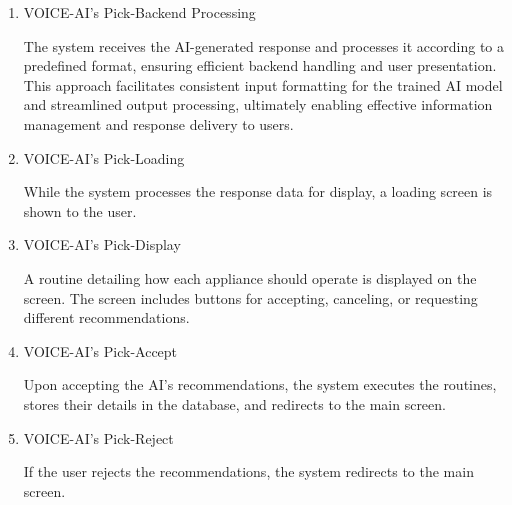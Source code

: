 \documentclass[conference]{IEEEtran}
\begin{document}
\begin{enumerate}[label=\arabic*]
\begin{enumerate}[label=\arabic*)]
        \vspace{1em}

        \item VOICE-AI's Pick-Backend Processing\par
        \vspace{0.3em}
         The system receives the AI-generated response and processes it according to a predefined format, ensuring efficient backend handling and user presentation. This approach facilitates consistent input formatting for the trained AI model and streamlined output processing, ultimately enabling effective information management and response delivery to users.

         \vspace{1em}

         \item VOICE-AI's Pick-Loading\par
         \vspace{0.3em}
         While the system processes the response data for display, a loading screen is shown to the user.

         \vspace{1em}

         \item VOICE-AI's Pick-Display\par
         \vspace{0.3em}
         A routine detailing how each appliance should operate is displayed on the screen. The screen includes buttons for accepting, canceling, or requesting different recommendations.

         \vspace{1em}

         \item VOICE-AI's Pick-Accept\par
         \vspace{0.3em}
         Upon accepting the AI's recommendations, the system executes the routines, stores their details in the database, and redirects to the main screen.

         \vspace{1em}

         \item VOICE-AI's Pick-Reject\par
         \vspace{0.3em}
         If the user rejects the recommendations, the system redirects to the main screen.


\end{enumerate}
\end{enumerate}
\end{document}
